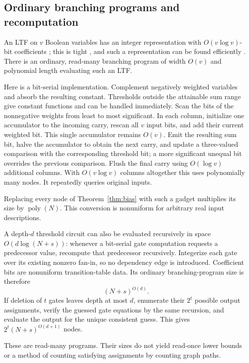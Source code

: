 \documentclass[11pt]{article}
\theoremstyle{definition}
\newcommand{\poly}{\operatorname{poly}}
\begin{document}
\subsection{Ordinary branching programs and recomputation}\label{sec:ordinaryBP}
An LTF on \(v\) Boolean variables has an integer representation with \(O(v\log v)\)-bit coefficients \cite{Muroga71}; this is tight \cite{Hastad94}, and such a representation can be found efficiently \cite{Hastad25}. There is an ordinary, read-many branching program of width \(O(v)\) and polynomial length evaluating such an LTF.

Here is a bit-serial implementation. Complement negatively weighted variables and absorb the resulting constant. Thresholds outside the attainable sum range give constant functions and can be handled immediately. Scan the bits of the nonnegative weights from least to most significant. In each column, initialize one accumulator to the incoming carry, rescan all \(v\) input bits, and add their current weighted bit. This single accumulator remains \(O(v)\). Emit the resulting sum bit, halve the accumulator to obtain the next carry, and update a three-valued comparison with the corresponding threshold bit; a more significant unequal bit overrides the previous comparison. Flush the final carry using \(O(\log v)\) additional columns. With \(O(v\log v)\) columns altogether this uses polynomially many nodes. It repeatedly queries original inputs.

Replacing every node of Theorem~\ref{thm:bias} with such a gadget multiplies its size by \(\poly(N)\). This conversion is nonuniform for arbitrary real input descriptions.

A depth-\(d\) threshold circuit can also be evaluated recursively in space
\(O(d\log(N+s))\): whenever a bit-serial gate computation requests a predecessor value, recompute that predecessor recursively. Integerize each gate over its existing nonzero fan-in, so no dependency edge is introduced. Coefficient bits are nonuniform transition-table data. Its ordinary branching-program size is therefore
\[
 (N+s)^{O(d)}.
\]
If deletion of \(t\) gates leaves depth at most \(d\), enumerate their \(2^t\) possible output assignments, verify the guessed gate equations by the same recursion, and evaluate the output for the unique consistent guess. This gives
\(2^t(N+s)^{O(d+1)}\) nodes.

These are read-many programs. Their sizes do not yield read-once lower bounds or a method of counting satisfying assignments by counting graph paths.
\end{document}
